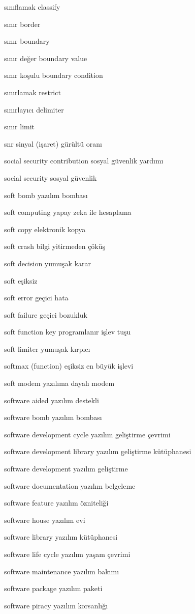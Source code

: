 \documentclass[12pt,fleqn]{article}\usepackage{../../common}
\begin{document}
sınıflamak classify

sınır border

sınır boundary

sınır değer boundary value

sınır koşulu boundary condition

sınırlamak restrict

sınırlayıcı delimiter

sınır limit

snr sinyal (işaret) gürültü oranı

social security contribution sosyal güvenlik yardımı

social security sosyal güvenlik

soft bomb yazılım bombası

soft computing yapay zeka ile hesaplama

soft copy elektronik kopya

soft crash bilgi yitirmeden çöküş

soft decision yumuşak karar

soft eşiksiz

soft error geçici hata

soft failure geçici bozukluk

soft function key programlanır işlev tuşu

soft limiter yumuşak kırpıcı

softmax (function) eşiksiz en büyük işlevi

soft modem yazılıma dayalı modem

software aided yazılım destekli

software bomb yazılım bombası

software development cycle yazılım geliştirme çevrimi

software development library yazılım geliştirme kütüphanesi

software development yazılım geliştirme

software documentation yazılım belgeleme

software feature yazılım özniteliği

software house yazılım evi

software library yazılım kütüphanesi

software life cycle yazılım yaşam çevrimi

software maintenance yazılım bakımı

software package yazılım paketi

software piracy yazılım korsanlığı
\end{document}
